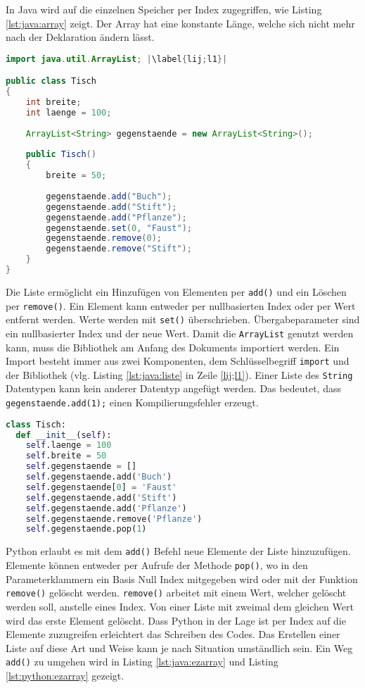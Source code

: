 In Java wird auf die einzelnen Speicher per Index zugegriffen, wie Listing \ref{lst:java:array} zeigt. Der Array hat eine konstante Länge, welche sich nicht mehr nach der Deklaration ändern lässt.
\newpage
\begin{lstlisting}[language=java,caption={Liste in Java},captionpos=b,label={lst:java:liste},frame=none,escapechar=|]
import java.util.ArrayList; |\label{lij;l1}|

public class Tisch
{
    int breite;
    int laenge = 100;
  
    ArrayList<String> gegenstaende = new ArrayList<String>();
  
    public Tisch()
    {
        breite = 50;
    
        gegenstaende.add("Buch");
        gegenstaende.add("Stift");
        gegenstaende.add("Pflanze");
        gegenstaende.set(0, "Faust");
        gegenstaende.remove(0);
        gegenstaende.remove("Stift");
    }
}
\end{lstlisting}

Die Liste ermöglicht ein Hinzufügen von Elementen per \texttt{add()} und ein Löschen per \texttt{remove()}. Ein Element kann entweder per nullbasierten Index oder per Wert entfernt werden. Werte werden mit \texttt{set()} überschrieben. Übergabeparameter sind ein nullbasierter Index und der neue Wert. Damit die \texttt{ArrayList} genutzt werden kann, muss die Bibliothek am Anfang des Dokuments importiert werden. Ein Import besteht immer aus zwei Komponenten, dem Schlüsselbegriff \texttt{import}  und der Bibliothek (vlg. Listing \ref{lst:java:liste} in Zeile \ref{lij;l1}). Einer Liste des \texttt{String} Datentypen kann kein anderer Datentyp angefügt werden. Das bedeutet, dass \texttt{gegenstaende.add(1);} einen Kompilierungsfehler erzeugt.

\begin{lstlisting}[language=python,caption={Liste in Python},captionpos=b,label={lst:python:liste},frame=none]
class Tisch:
  def __init__(self):
    self.laenge = 100
    self.breite = 50
    self.gegenstaende = []
    self.gegenstaende.add('Buch')
    self.gegenstaende[0] = 'Faust'
    self.gegenstaende.add('Stift')
    self.gegenstaende.add('Pflanze')
    self.gegenstaende.remove('Pflanze')
    self.gegenstaende.pop(1)
\end{lstlisting}

Python erlaubt es mit dem \texttt{add()} Befehl neue Elemente der Liste hinzuzufügen. Elemente können entweder per Aufrufe der Methode \texttt{pop()}, wo in den Parameterklammern ein Basis Null Index mitgegeben wird oder mit der Funktion \texttt{remove()} gelöscht werden. \texttt{remove()} arbeitet mit einem Wert, welcher gelöscht werden soll, anstelle eines Index. Von einer Liste mit zweimal dem gleichen Wert wird das erste Element gelöscht. Dass Python in der Lage ist per Index auf die Elemente zuzugreifen erleichtert das Schreiben des Codes. 
Das Erstellen einer Liste auf diese Art und Weise kann je nach Situation umständlich sein. Ein Weg \texttt{add()} zu umgehen wird in Listing \ref{lst:java:ezarray} und Listing \ref{lst:python:ezarray} gezeigt.

